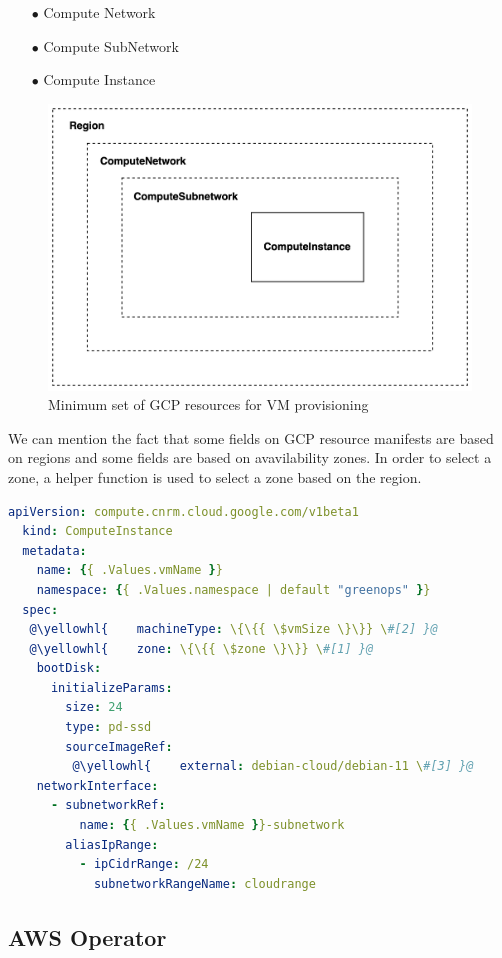 \begin{itemize}[itemsep=0.2pt, topsep=1pt] 
  \item[$\bullet$] Compute Network
  \item[$\bullet$] Compute SubNetwork
  \item[$\bullet$] Compute Instance
  \end{itemize}

\begin{figure}[H]
\centering
\includegraphics[width=0.75\linewidth]{images/gcp.png}
\caption{Minimum set of GCP resources for VM provisioning}
\label{fig:gcp}
\end{figure}

We can mention the fact that some fields on GCP resource manifests are based on regions and some fields are based on avavilability zones.
In order to select a zone, a helper function is used to select a zone based on the region.

\begin{lstlisting}[language=yaml, caption={GCP ComputeInstance Custom Resource}, label={lst:gcp}]
  apiVersion: compute.cnrm.cloud.google.com/v1beta1
  kind: ComputeInstance
  metadata:
    name: {{ .Values.vmName }}
    namespace: {{ .Values.namespace | default "greenops" }}
  spec:
   @\yellowhl{    machineType: \{\{{ \$vmSize \}\}} \#[2] }@
   @\yellowhl{    zone: \{\{{ \$zone \}\}} \#[1] }@
    bootDisk:
      initializeParams:
        size: 24
        type: pd-ssd
        sourceImageRef:
         @\yellowhl{    external: debian-cloud/debian-11 \#[3] }@
    networkInterface:
      - subnetworkRef:
          name: {{ .Values.vmName }}-subnetwork
        aliasIpRange:
          - ipCidrRange: /24
            subnetworkRangeName: cloudrange
\end{lstlisting}

\subsection{AWS Operator}

